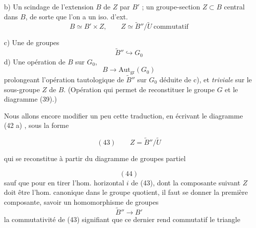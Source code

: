 \documentclass[11pt,a4paper]{article}
\begin{document}

b) Un scindage de l'extension $B$ de $Z$ par $B'$ ;  un groupe-section $Z\subset B$ central dans $B$, de sorte que l'on a un iso. d'ext.
\[
B\simeq B'\times Z,\qquad Z\simeq\tilde{B}''/\tilde{U} \ \text{commutatif}
\]

c) Une   de groupes
\[
\tilde{B}''\hookrightarrow G_0
\]
d) Une opération de $B$ sur $G_0$,
\[
B\longrightarrow\mathrm{Aut}_{\mathrm{gr}}(G_0)
\]
prolongeant l'opération tautologique de $\tilde{B}''$ sur $G_0$ déduite de c), et \emph{triviale} sur le sous-groupe $Z$ de $B$. (Opération qui permet de reconstituer le groupe $G$ et le diagramme (39).)

Nous allons encore modifier un peu cette traduction, en écrivant le diagramme (42 a) , sous la forme


\[
(43)\qquad Z=\tilde{B}''/\tilde{U}
\]

qui se reconstitue à partir du diagramme de groupes partiel


\[
(44)
\]
sauf que pour en tirer l'hom. horizontal $i$ de (43), dont la composante suivant $Z$ doit être l'hom. canonique dans le groupe quotient, il faut se donner la première composante, savoir un homomorphisme de groupes
\[
\tilde{B}''\longrightarrow B'
\]
la commutativité de (43) signifiant que ce dernier rend commutatif le triangle

\end{document}
